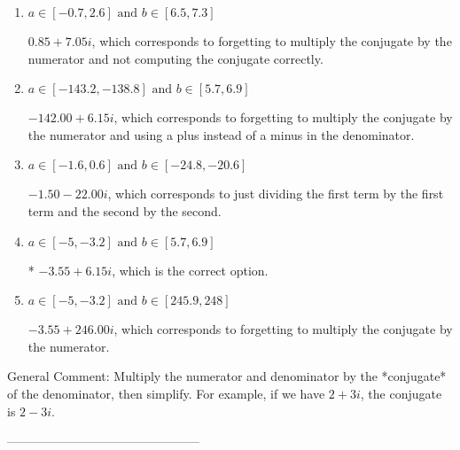 \documentclass{extbook}[14pt]
\begin{document}
\begin{enumerate}[label=\Alph*.] 
\item $ a \in [-0.7, 2.6] \text{ and } b \in [6.5, 7.3] $ 

  $0.85  + 7.05 i$, which corresponds to forgetting to multiply the conjugate by the numerator and not computing the conjugate correctly. 
\item $ a \in [-143.2, -138.8] \text{ and } b \in [5.7, 6.9] $ 

  $-142.00  + 6.15 i$, which corresponds to forgetting to multiply the conjugate by the numerator and using a plus instead of a minus in the denominator. 
\item $ a \in [-1.6, 0.6] \text{ and } b \in [-24.8, -20.6] $ 

  $-1.50  - 22.00 i$, which corresponds to just dividing the first term by the first term and the second by the second. 
\item $ a \in [-5, -3.2] \text{ and } b \in [5.7, 6.9] $ 

 * $-3.55  + 6.15 i$, which is the correct option. 
\item $ a \in [-5, -3.2] \text{ and } b \in [245.9, 248] $ 

  $-3.55  + 246.00 i$, which corresponds to forgetting to multiply the conjugate by the numerator. 
\end{enumerate} 
 
General Comment: Multiply the numerator and denominator by the *conjugate* of the denominator, then simplify. For example, if we have $2+3i$, the conjugate is $2-3i$.

-----------------------------------------------
\end{document}
